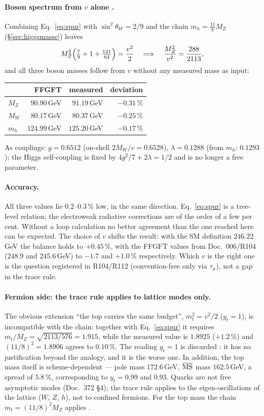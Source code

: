 \paragraph{Boson spectrum from $v$ alone \KM.}
Combining Eq.~\eqref{eq:spur} with $\sin^2\theta_W = 2/9$ and the chain
$m_h = \tfrac{11}{8}M_Z$ (§\ref{sec:higgsmasse}) leaves
\[
  M_Z^2\Bigl(\tfrac79 + 1 + \tfrac{121}{64}\Bigr) = \frac{v^2}{2}
  \quad\Longrightarrow\quad
  \frac{M_Z^2}{v^2} = \frac{288}{2113},
\]
and all three boson masses follow from $v$ without any measured mass as
input:
\begin{center}
\small\begin{tabular}{@{}lrrr@{}}
\toprule
 & FFGFT & measured & deviation \\
\midrule
$M_Z$ & $90.90$\,GeV & $91.19$\,GeV & $-0.31\,\%$ \\
$M_W$ & $80.17$\,GeV & $80.37$\,GeV & $-0.25\,\%$ \\
$m_h$ & $124.99$\,GeV & $125.20$\,GeV & $-0.17\,\%$ \\
\bottomrule
\end{tabular}
\end{center}
As couplings: $g = 0.6512$ (on-shell $2M_W/v = 0.6528$),
$\lambda = 0.1288$ (from $m_h$: $0.1293$); the Higgs self-coupling is fixed
by $4g^2/7 + 2\lambda = 1/2$ and is no longer a free parameter.

\paragraph{Accuracy.}
All three values lie $0.2$--$0.3\,\%$ low, in the same direction.
Eq.~\eqref{eq:spur} is a tree-level relation; the electroweak radiative
corrections are of the order of a few per cent. Without a loop calculation
no better agreement than the one reached here can be expected. The choice
of $v$ shifts the result: with the SM definition $246.22$\,GeV the balance
holds to $+0.45\,\%$, with the FFGFT values from Doc.~006/R104 ($248.9$ and
$245.6$\,GeV) to $-1.7$ and $+1.0\,\%$ respectively. Which $v$ is the right
one is the question registered in R104/R112 (convention-free only via
$\tau_\mu$), not a gap in the trace rule.

\paragraph{Fermion side: the trace rule applies to lattice modes only.}
The obvious extension ``the top carries the same budget'',
$m_t^2 = v^2/2$ ($y_t = 1$), is incompatible with the chain: together with
Eq.~\eqref{eq:spur} it requires $m_t/M_Z = \sqrt{2113/576} = 1.915$, while
the measured value is $1.8925$ ($+1.2\,\%$) and $(11/8)^2 = 1.8906$ agrees to
$0.10\,\%$. The reading $y_t = 1$ is discarded \XM: it has no justification
beyond the analogy, and it is the worse one. In addition, the top mass
itself is scheme-dependent --- pole mass $172.6$\,GeV, $\overline{\rm MS}$
mass $162.5$\,GeV, a spread of $5.8\,\%$, corresponding to $y_t = 0.99$ and
$0.93$. Quarks are not free asymptotic modes (Doc.~372 §4); the trace rule
applies to the eigen-oscillations of the lattice ($W$, $Z$, $h$), not to
confined fermions. For the top mass the chain $m_t = (11/8)^2M_Z$ applies
\KM.

